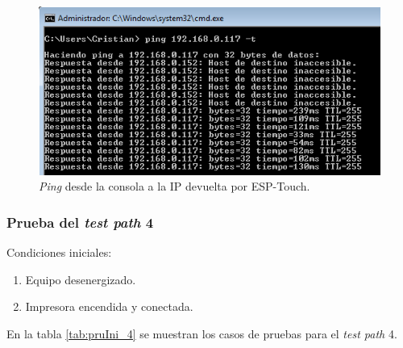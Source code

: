 \begin{figure}[htpb]
	\centering
	\includegraphics[scale=0.8]{./Figures/ping.png}
	\caption{\textit{Ping} desde la consola a la IP devuelta por ESP-Touch.}
	\label{fig:pruIni_3_ESPT_2}
\end{figure}

\subsubsection{Prueba del \textit{test path} 4}
\label{subsubsec:pruIni_4}

Condiciones iniciales: 

\begin{enumerate}
	\item Equipo desenergizado.
	\item Impresora encendida y conectada.
\end{enumerate}


En la tabla \ref{tab:pruIni_4} se muestran los casos de pruebas para el \textit{test path} 4.


